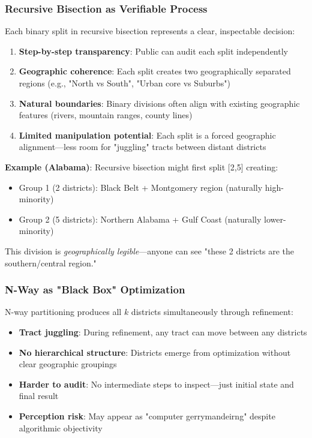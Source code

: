 \subsubsection{Recursive Bisection as Verifiable Process}

Each binary split in recursive bisection represents a clear, inspectable decision:
\begin{enumerate}
\item \textbf{Step-by-step transparency}: Public can audit each split independently
\item \textbf{Geographic coherence}: Each split creates two geographically separated regions (e.g., "North vs South", "Urban core vs Suburbs")
\item \textbf{Natural boundaries}: Binary divisions often align with existing geographic features (rivers, mountain ranges, county lines)
\item \textbf{Limited manipulation potential}: Each split is a forced geographic alignment—less room for "juggling" tracts between distant districts
\end{enumerate}

\textbf{Example (Alabama)}: Recursive bisection might first split [2,5] creating:
\begin{itemize}
\item Group 1 (2 districts): Black Belt + Montgomery region (naturally high-minority)
\item Group 2 (5 districts): Northern Alabama + Gulf Coast (naturally lower-minority)
\end{itemize}

This division is \textit{geographically legible}—anyone can see "these 2 districts are the southern/central region."

\subsubsection{N-Way as "Black Box" Optimization}

N-way partitioning produces all $k$ districts simultaneously through refinement:
\begin{itemize}
\item \textbf{Tract juggling}: During refinement, any tract can move between any districts
\item \textbf{No hierarchical structure}: Districts emerge from optimization without clear geographic groupings
\item \textbf{Harder to audit}: No intermediate steps to inspect—just initial state and final result
\item \textbf{Perception risk}: May appear as "computer gerrymandeirng" despite algorithmic objectivity
\end{itemize}

